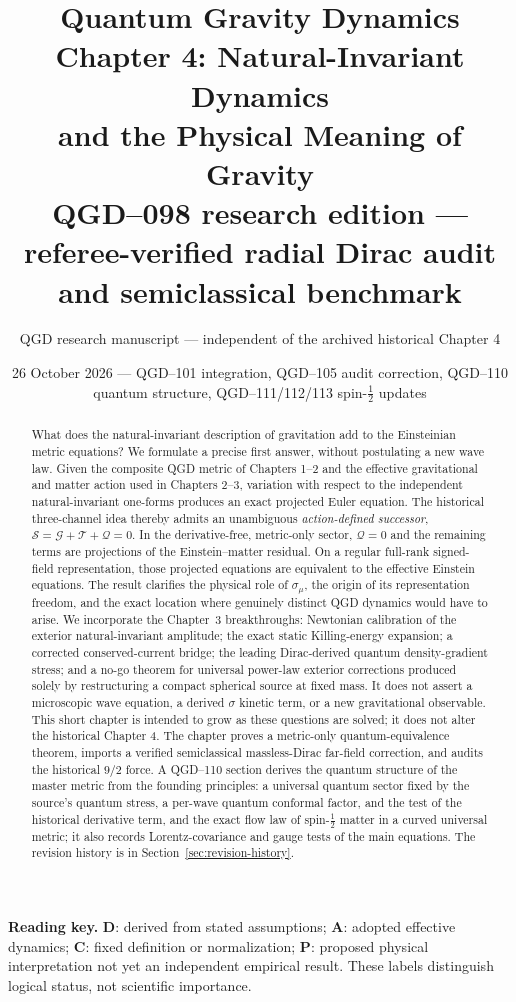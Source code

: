\documentclass[11pt,a4paper]{article}
\title{\textbf{Quantum Gravity Dynamics}\\[6pt]
\large Chapter 4: Natural-Invariant Dynamics\\ and the Physical Meaning of Gravity\\[5pt]
\normalsize QGD--098 research edition --- referee-verified radial Dirac audit and semiclassical benchmark}
\author{QGD research manuscript --- independent of the archived historical Chapter 4}
\date{26 October 2026 --- QGD--101 integration, QGD--105 audit correction, QGD--110 quantum structure, QGD--111/112/113 spin-$\frac12$ updates}
\newcommand{\cG}{\mathscr G}
\newcommand{\cT}{\mathscr T}
\newcommand{\cQ}{\mathscr Q}
\newcommand{\cS}{\mathscr S}
\begin{document}
\maketitle
\begin{abstract}
What does the natural-invariant description of gravitation add to the
Einsteinian metric equations? We formulate a precise first answer, without
postulating a new wave law. Given the composite QGD metric of Chapters 1--2
and the effective gravitational and matter action used in Chapters 2--3,
variation with respect to the independent natural-invariant one-forms
produces an exact projected Euler equation. The historical three-channel
idea thereby admits an unambiguous \emph{action-defined successor},
$\cS=\cG+\cT+\cQ=0$. In the derivative-free, metric-only sector,
$\cQ=0$ and the remaining terms are projections of the Einstein--matter
residual. On a regular full-rank signed-field representation, those
projected equations are equivalent to the effective Einstein equations.
The result clarifies the physical role of $\sigma_\mu$, the origin of its
representation freedom, and the exact location where genuinely distinct
QGD dynamics would have to arise. We incorporate the Chapter~3 breakthroughs:
Newtonian calibration of the exterior natural-invariant amplitude; the
exact static Killing-energy expansion; a corrected conserved-current
bridge; the leading Dirac-derived quantum density-gradient stress; and a
no-go theorem for universal power-law exterior corrections produced solely
by restructuring a compact spherical source at fixed mass. It does not assert a microscopic
wave equation, a derived $\sigma$ kinetic term, or a new gravitational
observable. This short chapter is intended to grow as these questions
are solved; it does not alter the historical Chapter 4. The chapter proves a metric-only quantum-equivalence theorem, imports a
verified semiclassical massless-Dirac far-field correction, and audits the
historical $9/2$ force. A QGD--110 section derives the quantum structure of the
master metric from the founding principles: a universal quantum sector fixed by the
source's quantum stress, a per-wave quantum conformal factor, and the test of the
historical derivative term, and the exact flow law of spin-$\frac12$ matter in a curved
universal metric; it also records Lorentz-covariance and gauge tests of the main
equations. The revision history is in
Section~\ref{sec:revision-history}.
\end{abstract}

\noindent\textbf{Reading key.} \textbf{D}: derived from stated assumptions;
\textbf{A}: adopted effective dynamics; \textbf{C}: fixed definition or
normalization; \textbf{P}: proposed physical interpretation not yet an
independent empirical result. These labels distinguish logical status,
not scientific importance.
\end{document}
